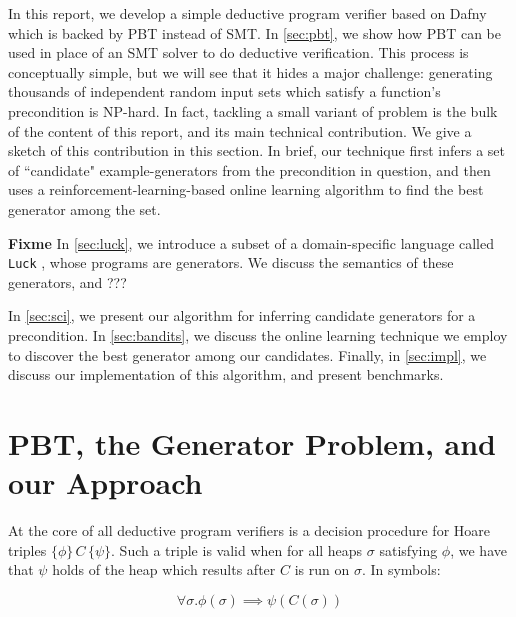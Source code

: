 \documentclass[10pt,a4paper]{article}
\begin{document}
In this report, we develop a simple deductive program verifier based on Dafny which is backed by PBT instead of SMT. In \autoref{sec:pbt}, we show how PBT can be used in place of an SMT solver to do deductive verification. This process is conceptually simple, but we will see that it hides a major challenge: generating thousands of independent random input sets which satisfy a function's precondition is NP-hard. In fact, tackling a small variant of problem is the bulk of the content of this report, and its main technical contribution. We give a sketch of this contribution in this section. In brief, our technique first infers a set of ``candidate" example-generators from the precondition in question, and then uses a reinforcement-learning-based online learning algorithm to find the best generator among the set.

\textbf{Fixme}
In \autoref{sec:luck}, we introduce a subset of a domain-specific language called \texttt{Luck} \cite{}, whose programs are generators. We discuss the semantics of these generators, and ???

In \autoref{sec:sci}, we present our algorithm for inferring candidate generators for a precondition. In \autoref{sec:bandits}, we discuss the online learning technique we employ to discover the best generator among our candidates. Finally, in \autoref{sec:impl}, we discuss our implementation of this algorithm, and present benchmarks.



\section{PBT, the Generator Problem, and our Approach}
\label{sec:pbt}
At the core of all deductive program verifiers is a decision procedure for Hoare triples $\{\phi\}\, C \, \{\psi\}$. Such a triple is valid when for all heaps $\sigma$ satisfying $\phi$, we have that $\psi$ holds of the heap which results after $C$ is run on $\sigma$. In symbols:

\[
\forall \sigma. \phi(\sigma) \implies \psi(C(\sigma)) \tag{$\ast$}
\]
\end{document}
